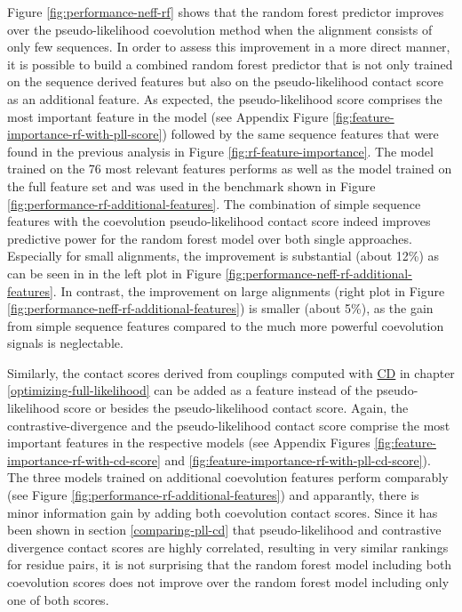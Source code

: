 \documentclass[11pt,a4paper,twoside]{book}
\theoremstyle{definition}
\theoremstyle{definition}
\theoremstyle{remark}
\begin{document}
Figure \ref{fig:performance-neff-rf} shows that the random forest
predictor improves over the pseudo-likelihood coevolution method when
the alignment consists of only few sequences. In order to assess this
improvement in a more direct manner, it is possible to build a combined
random forest predictor that is not only trained on the sequence derived
features but also on the pseudo-likelihood contact score as an
additional feature. As expected, the pseudo-likelihood score comprises
the most important feature in the model (see Appendix Figure
\ref{fig:feature-importance-rf-with-pll-score}) followed by the same
sequence features that were found in the previous analysis in Figure
\ref{fig:rf-feature-importance}. The model trained on the 76 most
relevant features performs as well as the model trained on the full
feature set and was used in the benchmark shown in Figure
\ref{fig:performance-rf-additional-features}. The combination of simple
sequence features with the coevolution pseudo-likelihood contact score
indeed improves predictive power for the random forest model over both
single approaches. Especially for small alignments, the improvement is
substantial (about 12\%) as can be seen in in the left plot in Figure
\ref{fig:performance-neff-rf-additional-features}. In contrast, the
improvement on large alignments (right plot in Figure
\ref{fig:performance-neff-rf-additional-features}) is smaller (about
5\%), as the gain from simple sequence features compared to the much
more powerful coevolution signals is neglectable.

Similarly, the contact scores derived from couplings computed with
\protect\hyperlink{abbrev}{CD} in chapter
\ref{optimizing-full-likelihood} can be added as a feature instead of
the pseudo-likelihood score or besides the pseudo-likelihood contact
score. Again, the contrastive-divergence and the pseudo-likelihood
contact score comprise the most important features in the respective
models (see Appendix Figures
\ref{fig:feature-importance-rf-with-cd-score} and
\ref{fig:feature-importance-rf-with-pll-cd-score}). The three models
trained on additional coevolution features perform comparably (see
Figure \ref{fig:performance-rf-additional-features}) and apparantly,
there is minor information gain by adding both coevolution contact
scores. Since it has been shown in section \ref{comparing-pll-cd} that
pseudo-likelihood and contrastive divergence contact scores are highly
correlated, resulting in very similar rankings for residue pairs, it is
not surprising that the random forest model including both coevolution
scores does not improve over the random forest model including only one
of both scores.
\end{document}
